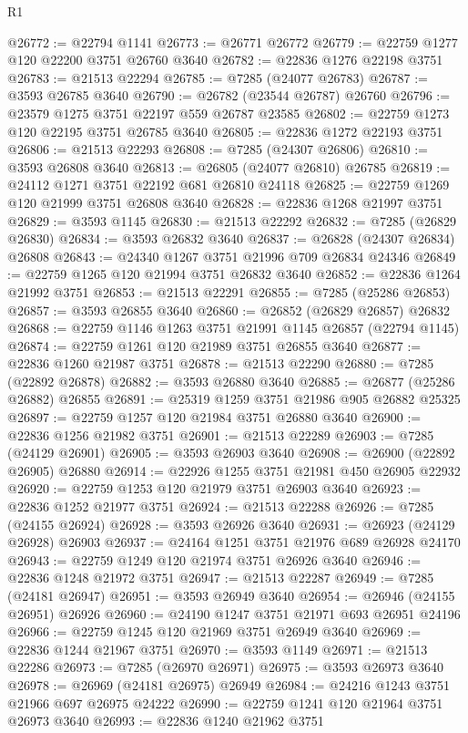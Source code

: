 \begin{lexlean}{R1}
\begin{coremodule}
@26772 := @22794 @1141
@26773 := @26771 @26772
@26779 := @22759 @1277 @120 @22200 @3751 @26760 @3640
@26782 := @22836 @1276 @22198 @3751
@26783 := @21513 @22294
@26785 := @7285 (@24077 @26783)
@26787 := @3593 @26785 @3640
@26790 := @26782 (@23544 @26787) @26760
@26796 := @23579 @1275 @3751 @22197 @559 @26787 @23585
@26802 := @22759 @1273 @120 @22195 @3751 @26785 @3640
@26805 := @22836 @1272 @22193 @3751
@26806 := @21513 @22293
@26808 := @7285 (@24307 @26806)
@26810 := @3593 @26808 @3640
@26813 := @26805 (@24077 @26810) @26785
@26819 := @24112 @1271 @3751 @22192 @681 @26810 @24118
@26825 := @22759 @1269 @120 @21999 @3751 @26808 @3640
@26828 := @22836 @1268 @21997 @3751
@26829 := @3593 @1145
@26830 := @21513 @22292
@26832 := @7285 (@26829 @26830)
@26834 := @3593 @26832 @3640
@26837 := @26828 (@24307 @26834) @26808
@26843 := @24340 @1267 @3751 @21996 @709 @26834 @24346
@26849 := @22759 @1265 @120 @21994 @3751 @26832 @3640
@26852 := @22836 @1264 @21992 @3751
@26853 := @21513 @22291
@26855 := @7285 (@25286 @26853)
@26857 := @3593 @26855 @3640
@26860 := @26852 (@26829 @26857) @26832
@26868 := @22759 @1146 @1263 @3751 @21991 @1145 @26857 (@22794 @1145)
@26874 := @22759 @1261 @120 @21989 @3751 @26855 @3640
@26877 := @22836 @1260 @21987 @3751
@26878 := @21513 @22290
@26880 := @7285 (@22892 @26878)
@26882 := @3593 @26880 @3640
@26885 := @26877 (@25286 @26882) @26855
@26891 := @25319 @1259 @3751 @21986 @905 @26882 @25325
@26897 := @22759 @1257 @120 @21984 @3751 @26880 @3640
@26900 := @22836 @1256 @21982 @3751
@26901 := @21513 @22289
@26903 := @7285 (@24129 @26901)
@26905 := @3593 @26903 @3640
@26908 := @26900 (@22892 @26905) @26880
@26914 := @22926 @1255 @3751 @21981 @450 @26905 @22932
@26920 := @22759 @1253 @120 @21979 @3751 @26903 @3640
@26923 := @22836 @1252 @21977 @3751
@26924 := @21513 @22288
@26926 := @7285 (@24155 @26924)
@26928 := @3593 @26926 @3640
@26931 := @26923 (@24129 @26928) @26903
@26937 := @24164 @1251 @3751 @21976 @689 @26928 @24170
@26943 := @22759 @1249 @120 @21974 @3751 @26926 @3640
@26946 := @22836 @1248 @21972 @3751
@26947 := @21513 @22287
@26949 := @7285 (@24181 @26947)
@26951 := @3593 @26949 @3640
@26954 := @26946 (@24155 @26951) @26926
@26960 := @24190 @1247 @3751 @21971 @693 @26951 @24196
@26966 := @22759 @1245 @120 @21969 @3751 @26949 @3640
@26969 := @22836 @1244 @21967 @3751
@26970 := @3593 @1149
@26971 := @21513 @22286
@26973 := @7285 (@26970 @26971)
@26975 := @3593 @26973 @3640
@26978 := @26969 (@24181 @26975) @26949
@26984 := @24216 @1243 @3751 @21966 @697 @26975 @24222
@26990 := @22759 @1241 @120 @21964 @3751 @26973 @3640
@26993 := @22836 @1240 @21962 @3751

\end{coremodule}
\end{lexlean}

